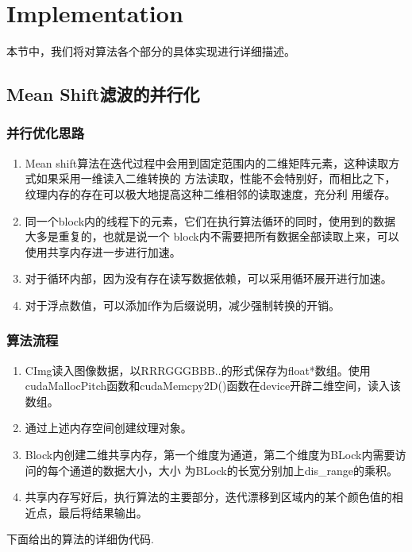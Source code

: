 \documentclass[a4paper, 11pt]{article}
\begin{document}
\clearpage
\section{Implementation}
本节中，我们将对算法各个部分的具体实现进行详细描述。

\subsection{Mean Shift滤波的并行化}

\subsubsection{并行优化思路}
\begin{enumerate}
    \item Mean shift算法在迭代过程中会用到固定范围内的二维矩阵元素，这种读取方式如果采用一维读入二维转换的 方法读取，性能不会特别好，而相比之下，纹理内存的存在可以极大地提高这种二维相邻的读取速度，充分利 用缓存。
    \item 同一个block内的线程下的元素，它们在执行算法循环的同时，使用到的数据大多是重复的，也就是说一个 block内不需要把所有数据全部读取上来，可以使用共享内存进一步进行加速。
    \item 对于循环内部，因为没有存在读写数据依赖，可以采用循环展开进行加速。
    \item 对于浮点数值，可以添加f作为后缀说明，减少强制转换的开销。
\end{enumerate}

\subsubsection{算法流程}

\begin{enumerate}
    \item CImg读入图像数据，以RRRGGGBBB..的形式保存为ﬂoat*数组。使用cudaMallocPitch函数和cudaMemcpy2D()函数在device开辟二维空间，读入该数组。
    \item 通过上述内存空间创建纹理对象。
    \item Block内创建二维共享内存，第一个维度为通道，第二个维度为BLock内需要访问的每个通道的数据大小，大小 为BLock的长宽分别加上dis\_range的乘积。
    \item 共享内存写好后，执行算法的主要部分，迭代漂移到区域内的某个颜色值的相近点，最后将结果输出。
\end{enumerate}

下面给出的算法的详细伪代码.
\end{document}
